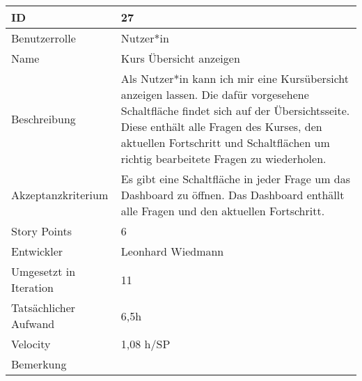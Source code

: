 \begin{tabularx}{\textwidth}{|p{}|X|}
	\hline
	ID & 27 \\
	\hline
	Benutzerrolle & Nutzer*in \\
	\hline
	Name & Kurs Übersicht anzeigen\\
	\hline
	Beschreibung & Als Nutzer*in kann ich mir eine Kursübersicht anzeigen lassen. Die dafür vorgesehene Schaltfläche findet sich auf der Übersichtsseite.
		Diese enthält alle Fragen des Kurses, den aktuellen Fortschritt und Schaltflächen um richtig bearbeitete Fragen zu wiederholen. \\
	\hline
	Akzeptanzkriterium & Es gibt eine Schaltfläche in jeder Frage um das Dashboard zu öffnen. Das Dashboard enthällt alle Fragen und den aktuellen Fortschritt. \\
	\hline
	Story Points & 6 \\
	\hline
	Entwickler & Leonhard Wiedmann \\
	\hline
	Umgesetzt in Iteration & 11 \\
	\hline
	Tatsächlicher Aufwand & 6,5h\\
	\hline
	Velocity & 1,08 h/SP\\
	\hline
	Bemerkung & \\
	\hline
\end{tabularx}
\vspace{20pt}
